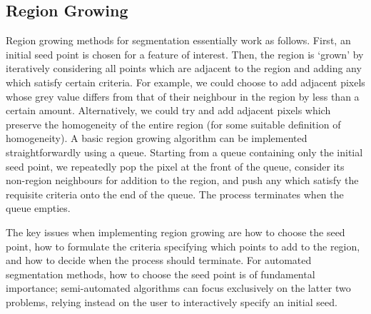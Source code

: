 
\subsection{Region Growing}


Region growing methods for segmentation essentially work as follows. First, an initial seed point is chosen for a feature of interest. Then, the region is `grown' by iteratively considering all points which are adjacent to the region and adding any which satisfy certain criteria. For example, we could choose to add adjacent pixels whose grey value differs from that of their neighbour in the region by less than a certain amount. Alternatively, we could try and add adjacent pixels which preserve the homogeneity of the entire region (for some suitable definition of homogeneity). A basic region growing algorithm can be implemented straightforwardly using a queue. Starting from a queue containing only the initial seed point, we repeatedly pop the pixel at the front of the queue, consider its non-region neighbours for addition to the region, and push any which satisfy the requisite criteria onto the end of the queue. The process terminates when the queue empties.

The key issues when implementing region growing are how to choose the seed point, how to formulate the criteria specifying which points to add to the region, and how to decide when the process should terminate. For automated segmentation methods, how to choose the seed point is of fundamental importance; semi-automated algorithms can focus exclusively on the latter two problems, relying instead on the user to interactively specify an initial seed.

